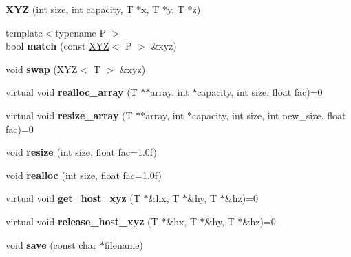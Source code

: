\begin{DoxyCompactItemize}
\item 
\hypertarget{classXYZ_a5abe4746ca1e21edd335eaf5fcba0375}{}\label{classXYZ_a5abe4746ca1e21edd335eaf5fcba0375} 
{\bfseries X\+YZ} (int size, int capacity, T $\ast$x, T $\ast$y, T $\ast$z)
\item 
\hypertarget{classXYZ_a967ddfe39739bd7715c83a01911ecfb4}{}\label{classXYZ_a967ddfe39739bd7715c83a01911ecfb4} 
{\footnotesize template$<$typename P $>$ }\\bool {\bfseries match} (const \hyperlink{classXYZ}{X\+YZ}$<$ P $>$ \&xyz)
\item 
\hypertarget{classXYZ_afcd15ec3cb6ad805d12e690c45f0f795}{}\label{classXYZ_afcd15ec3cb6ad805d12e690c45f0f795} 
void {\bfseries swap} (\hyperlink{classXYZ}{X\+YZ}$<$ T $>$ \&xyz)
\item 
\hypertarget{classXYZ_aaf4de0a9d062c01602c529274154186c}{}\label{classXYZ_aaf4de0a9d062c01602c529274154186c} 
virtual void {\bfseries realloc\+\_\+array} (T $\ast$$\ast$array, int $\ast$capacity, int size, float fac)=0
\item 
\hypertarget{classXYZ_a3fb6089d57851dbc8509e93b2dd2fb9a}{}\label{classXYZ_a3fb6089d57851dbc8509e93b2dd2fb9a} 
virtual void {\bfseries resize\+\_\+array} (T $\ast$$\ast$array, int $\ast$capacity, int size, int new\+\_\+size, float fac)=0
\item 
\hypertarget{classXYZ_a145ad0d3bc70e44181a0a7bc21207a47}{}\label{classXYZ_a145ad0d3bc70e44181a0a7bc21207a47} 
void {\bfseries resize} (int size, float fac=1.\+0f)
\item 
\hypertarget{classXYZ_a54b4a0b744457325060f2bcb016a0b1a}{}\label{classXYZ_a54b4a0b744457325060f2bcb016a0b1a} 
void {\bfseries realloc} (int size, float fac=1.\+0f)
\item 
\hypertarget{classXYZ_ac7d50ccb58b6e66c2eb05b83dcea6de4}{}\label{classXYZ_ac7d50ccb58b6e66c2eb05b83dcea6de4} 
virtual void {\bfseries get\+\_\+host\+\_\+xyz} (T $\ast$\&hx, T $\ast$\&hy, T $\ast$\&hz)=0
\item 
\hypertarget{classXYZ_a9eb21db264a140fe482a0a2d9ee31c4a}{}\label{classXYZ_a9eb21db264a140fe482a0a2d9ee31c4a} 
virtual void {\bfseries release\+\_\+host\+\_\+xyz} (T $\ast$\&hx, T $\ast$\&hy, T $\ast$\&hz)=0
\item 
\hypertarget{classXYZ_a7abeecd88fef6761a8a3da7f56474eec}{}\label{classXYZ_a7abeecd88fef6761a8a3da7f56474eec} 
void {\bfseries save} (const char $\ast$filename)
\item 
\hypertarget{classXYZ_a13044d0233ae303b19b0ff168a303ddc}{}\label{classXYZ_a13044d0233ae303b19b0ff168a303ddc} 

\end{DoxyCompactItemize}
